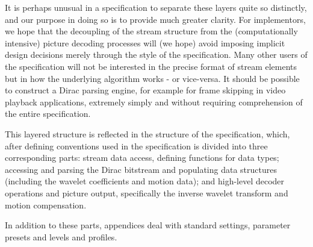It is perhaps unusual in a specification to separate these layers quite so distinctly, 
and our purpose in doing so is to provide much greater clarity. For implementors,
we hope that the decoupling of the stream structure from the (computationally intensive)
picture decoding processes will (we hope) avoid imposing
implicit design decisions merely through the style of the specification. Many
other users of the specification will not be interested in the precise format
of stream elements but in how the underlying algorithm works - or vice-versa.
It should be possible to construct a Dirac parsing engine, for example for
frame skipping in video playback applications, extremely simply and without
requiring comprehension of the entire specification.

This layered structure is reflected in the structure of the specification,
which, after defining conventions used in the specification is divided into three
corresponding parts: stream data access, defining functions for data types; 
accessing and parsing the Dirac bitstream and populating data
structures (including the wavelet coefficients and motion data); and 
high-level decoder operations and picture output, specifically the
inverse wavelet transform and motion compensation.

\begin{comment}
This layered structure is reflected in the structure of the specification,
which is divided into four parts. The first part introduces Dirac concepts,
both informatively, in terms of describing Dirac video coding processes, and
normatively, in terms of defining terms, concepts and conventions used 
throughout the specification.

The second part defines stream data access functions for data types. Part III
deals with accessing, parsing the Dirac bitstream and populating data
structures, including the wavelet coefficient and motion data.

Part IV defines high-level decoder operations and picture output, specifically the
inverse wavelet transform and motion compensation.
\end{comment}
In addition to these parts, appendices deal with standard settings, parameter
presets and levels and profiles.